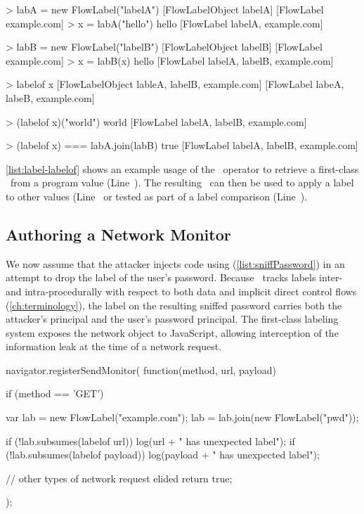 \begin{jscode}
> labA = new FlowLabel("labelA")
  [FlowLabelObject labelA] [FlowLabel example.com]
> x = labA("hello")
  hello [FlowLabel labelA, example.com]

> labB = new FlowLabel("labelB")
  [FlowLabelObject labelB] [FlowLabel example.com]
> x = labB(x)
  hello [FlowLabel labelA, labelB, example.com]

> labelof x
  [FlowLabelObject lableA, labelB, example.com]
    [FlowLabel labeA, labeB, example.com]

> (labelof x)("world")
  world [FlowLabel labelA, labelB, example.com]

> (labelof x) === labA.join(labB)
  true [FlowLabel labelA, labelB, example.com]
\end{jscode}

\autoref{list:label-labelof} shows an example usage of the \mlabelof\ operator to retrieve a first-class \FlowLabelObject\ from a program value (Line~).
The resulting \FlowLabelObject\ can then be used to apply a label to other values (Line~ or tested as part of a label comparison (Line~).

\subsection{Authoring a Network Monitor}
\label{subsec:network-monitor}

We now assume that the attacker injects code using  (\autoref{list:sniffPassword}) in an attempt to drop the label of the user's password.
Because \FlowCore\ tracks labels inter- and intra-procedurally with respect to both data and implicit direct control flows (\autoref{ch:terminology}), the label on the resulting sniffed password carries both the attacker's principal and the user's password principal.
The first-class labeling system exposes the network object to JavaScript, allowing interception of the information leak at the time of a network request.

\begin{jscode}
navigator.registerSendMonitor(
  function(method, url, payload) {
    if (method == 'GET') {
      var lab = new FlowLabel("example.com");
      lab = lab.join(new FlowLabel("pwd"));

      if (!lab.subsumes(labelof url))
        log(url + " has unexpected label");
      if (!lab.subsumes(labelof payload))
        log(payload + " has unexpected label");
    }
    // other types of network request elided
    return true;
  });
\end{jscode}


